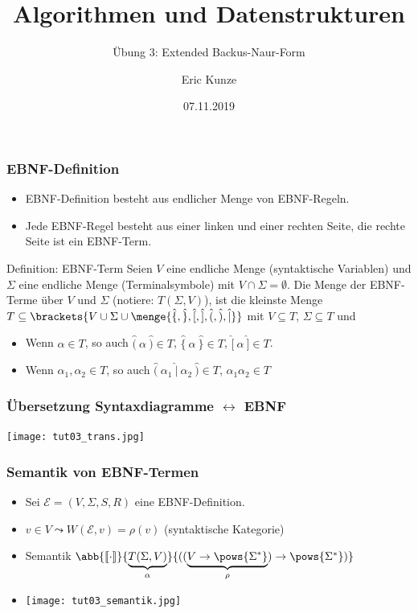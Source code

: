 \documentclass{beamer}
\newcommand{\wdh}[1]{\hat{\{} \ #1 \ \hat{\}}}
\newcommand{\opt}[2]{\hat{(} \ #1 \ \hat{|} \ #2 \ \hat{)}}
\newcommand{\byp}[1]{\hat{[} \ #1 \ \hat{]}}
\newcommand{\rdb}[1]{\hat{(} \ #1 \ \hat{)}}
\newcommand{\sem}[1]{\left\llbracket #1 \right\rrbracket}
\begin{document}
	
	\title{Algorithmen und Datenstrukturen}
	\subtitle{Übung 3: Extended Backus-Naur-Form}
	\author{Eric Kunze}
	\date{07.11.2019}

	\maketitle



\begin{frame} \frametitle{EBNF-Definition}
	\small
	\begin{itemize}
		\item EBNF-Definition besteht aus endlicher Menge von EBNF-Regeln.
		\item Jede EBNF-Regel besteht aus einer linken und einer rechten Seite, die rechte Seite ist ein EBNF-Term.
	\end{itemize}
	\pause
	\begin{block}{Definition: EBNF-Term}
		Seien $V$ eine endliche Menge (syntaktische Variablen) und $\Sigma$ eine endliche Menge (Terminalsymbole) mit $V \cap \Sigma = \emptyset$. Die Menge der EBNF-Terme über $V$ und $\Sigma$ (notiere: $T(\Sigma, V)$), ist die kleinste Menge $T \subseteq \brackets{V \cup \Sigma \cup \menge{\hat{\{}, \hat{\}}, \hat{[}, \hat{]}, \hat{(}, \hat{)}, \hat{|}}}$ mit $V \subseteq T$, $\Sigma \subseteq T$ und
		\begin{itemize}
			\item Wenn $\alpha \in T$, so auch $\rdb{\alpha} \in T$, $\wdh{\alpha} \in T$, $\byp{\alpha} \in T$.
			\item Wenn $\alpha_1, \alpha_2 \in T$, so auch $\opt{\alpha_1}{\alpha_2} \in T$, $\alpha_1 \alpha_2 \in T$
		\end{itemize}
	\end{block}
\end{frame}

\begin{frame} \frametitle{Übersetzung Syntaxdiagramme $\leftrightarrow$ EBNF}
	\centering
	\texttt{[image: tut03\_trans.jpg]}
\end{frame}

\begin{frame} \frametitle{Semantik von EBNF-Termen}
	\begin{itemize}
		\item Sei $\mathcal{E} = (V,\Sigma,S,R)$ eine EBNF-Definition.
		\item $v \in V \leadsto W(\mathcal{E},v) = \rho(v)$ (syntaktische Kategorie)
		\item Semantik $\abb{\sem{\cdot}}{\underbrace{T(\Sigma, V)}_{\alpha}}{((\underbrace{V \to \pows{\Sigma^\ast}}_{\rho}) \to \pows{\Sigma^\ast})}$
		\item[] \texttt{[image: tut03\_semantik.jpg]}
	\end{itemize}	
\end{frame}
\end{document}
